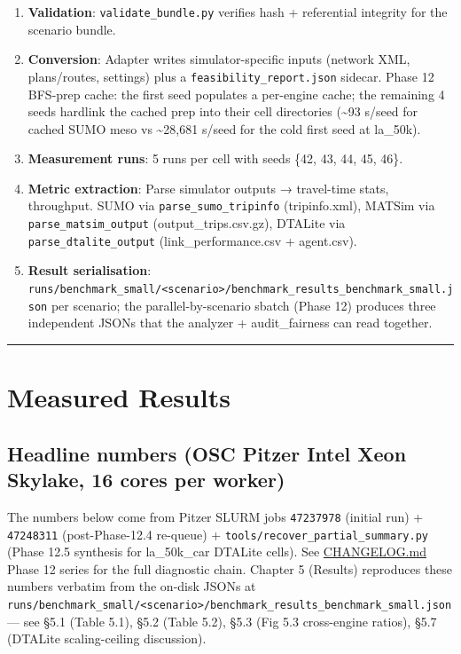 \begin{enumerate}
\def\labelenumi{\arabic{enumi}.}
\tightlist
\item
  \textbf{Validation}: \texttt{validate\_bundle.py} verifies hash +
  referential integrity for the scenario bundle.
\item
  \textbf{Conversion}: Adapter writes simulator-specific inputs (network
  XML, plans/routes, settings) plus a \texttt{feasibility\_report.json}
  sidecar. Phase 12 BFS-prep cache: the first seed populates a
  per-engine cache; the remaining 4 seeds hardlink the cached prep into
  their cell directories (\textasciitilde93 s/seed for cached SUMO meso
  vs \textasciitilde28,681 s/seed for the cold first seed at la\_50k).
\item
  \textbf{Measurement runs}: 5 runs per cell with seeds \{42, 43, 44,
  45, 46\}.
\item
  \textbf{Metric extraction}: Parse simulator outputs → travel-time
  stats, throughput. SUMO via \texttt{parse\_sumo\_tripinfo}
  (tripinfo.xml), MATSim via \texttt{parse\_matsim\_output}
  (output\_trips.csv.gz), DTALite via \texttt{parse\_dtalite\_output}
  (link\_performance.csv + agent.csv).
\item
  \textbf{Result serialisation}:
  \texttt{runs/benchmark\_small/\textless{}scenario\textgreater{}/benchmark\_results\_benchmark\_small.json}
  per scenario; the parallel-by-scenario sbatch (Phase 12) produces
  three independent JSONs that the analyzer + audit\_fairness can read
  together.
\end{enumerate}

\begin{center}\rule{0.5\linewidth}{0.5pt}\end{center}

\section{Measured Results}\label{44-measured-results}

\subsection{Headline numbers (OSC Pitzer Intel Xeon Skylake, 16
cores per
worker)}\label{441-headline-numbers-osc-pitzer-intel-xeon-skylake-16-cores-per-worker}

The numbers below come from Pitzer SLURM jobs \texttt{47237978} (initial
run) + \texttt{47248311} (post-Phase-12.4 re-queue) +
\texttt{tools/recover\_partial\_summary.py} (Phase 12.5 synthesis for
la\_50k\_car DTALite cells). See \href{../../CHANGELOG.md}{CHANGELOG.md}
Phase 12 series for the full diagnostic chain. Chapter 5 (Results)
reproduces these numbers verbatim from the on-disk JSONs at
\texttt{runs/benchmark\_small/\textless{}scenario\textgreater{}/benchmark\_results\_benchmark\_small.json}
--- see §5.1 (Table 5.1), §5.2 (Table 5.2), §5.3 (Fig 5.3 cross-engine
ratios), §5.7 (DTALite scaling-ceiling discussion).

